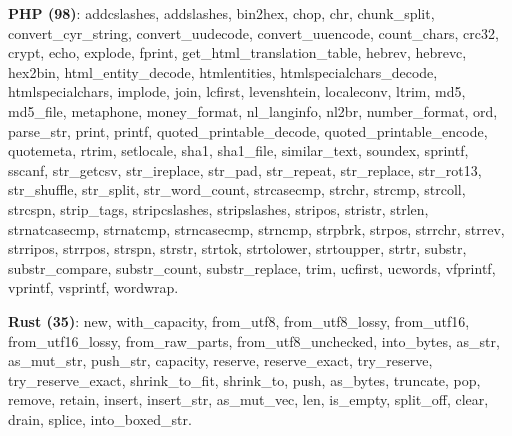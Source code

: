 \documentclass[anonymous,sigplan,review,11pt,nonacm,natbib=false]{acmart}
\begin{document}
    \textbf{PHP (98)}: addcslashes, addslashes, bin2hex, chop, chr, chunk\_split, convert\_cyr\_string, convert\_uudecode, convert\_uuencode, count\_chars, crc32, crypt, echo, explode, fprint, get\_html\_translation\_table, hebrev, hebrevc, hex2bin, html\_entity\_decode, htmlentities, htmlspecialchars\_decode, htmlspecialchars, implode, join, lcfirst, levenshtein, localeconv, ltrim, md5, md5\_file, metaphone, money\_format, nl\_langinfo, nl2br, number\_format, ord, parse\_str, print, printf, quoted\_printable\_decode, quoted\_printable\_encode, quotemeta, rtrim, setlocale, sha1, sha1\_file, similar\_text, soundex, sprintf, sscanf, str\_getcsv, str\_ireplace, str\_pad, str\_repeat, str\_replace, str\_rot13, str\_shuffle, str\_split, str\_word\_count, strcasecmp, strchr, strcmp, strcoll, strcspn, strip\_tags, stripcslashes, stripslashes, stripos, stristr, strlen, strnatcasecmp, strnatcmp, strncasecmp, strncmp, strpbrk, strpos, strrchr, strrev, strripos, strrpos, strspn, strstr, strtok, strtolower, strtoupper, strtr, substr, substr\_compare, substr\_count, substr\_replace, trim, ucfirst, ucwords, vfprintf, vprintf, vsprintf, wordwrap.

    \textbf{Rust (35)}: new, with\_capacity, from\_utf8, from\_utf8\_lossy, from\_utf16, from\_utf16\_lossy, from\_raw\_parts, from\_utf8\_unchecked, into\_bytes, as\_str, as\_mut\_str, push\_str, capacity, reserve, reserve\_exact, try\_reserve, try\_reserve\_exact, shrink\_to\_fit, shrink\_to, push, as\_bytes, truncate, pop, remove, retain, insert, insert\_str, as\_mut\_vec, len, is\_empty, split\_off, clear, drain, splice, into\_boxed\_str.
\end{document}
